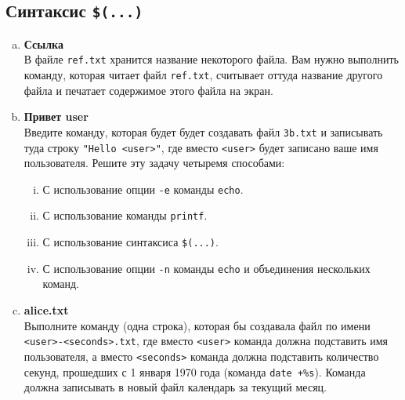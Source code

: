 \documentclass{article}
\begin{document}
\subsection{Синтаксис \texttt{\$(...)}}
\begin{enumerate}[a.]


\item \textbf{Ссылка}\\
В файле \texttt{ref.txt} хранится название некоторого файла. Вам нужно выполнить команду, которая читает файл \texttt{ref.txt}, считывает оттуда название другого файла и печатает содержимое этого файла на экран.

\item \textbf{Привет user}\\
Введите команду, которая будет будет создавать файл \texttt{3b.txt} и записывать туда строку \texttt{"Hello <user>"}, где вместо \texttt{<user>} будет записано ваше имя пользователя. Решите эту задачу четыремя способами:
\begin{enumerate}[i.]
\item С использование опции \texttt{-e} команды \texttt{echo}.
\item С использование команды \texttt{printf}.
\item С использование синтаксиса \texttt{\$(...)}.
\item С использование опции \texttt{-n} команды \texttt{echo} и объединения нескольких команд.
\end{enumerate}

\item \textbf{alice.txt}\\
Выполните команду (одна строка), которая бы создавала файл по имени \texttt{<user>-<seconds>.txt}, где вместо \texttt{<user>} команда должна подставить имя пользователя, а вместо \texttt{<seconds>} команда должна подставить количество секунд, прошедших с 1 января 1970 года (команда \texttt{date +\%s}). Команда должна записывать в новый файл календарь за текущий месяц.

\end{enumerate}
\end{document}
